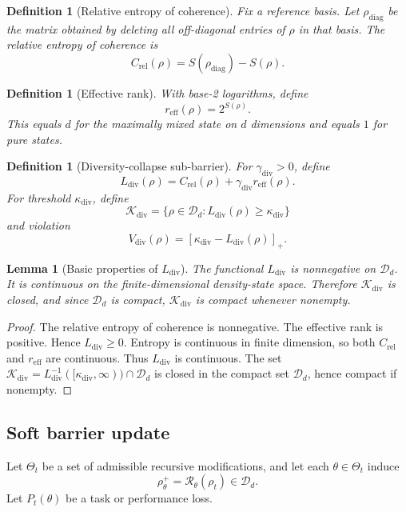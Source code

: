 \documentclass[11pt]{article}
\newtheorem{lemma}[theorem]{Lemma}
\newtheorem{definition}[theorem]{Definition}
\newcommand{\D}{\mathcal{D}}
\newcommand{\K}{\mathcal{K}}
\newcommand{\Rcal}{\mathcal{R}}
\newcommand{\1}{\mathbf{1}}
\newcommand{\diver}{\mathrm{div}}
\newcommand{\rel}{\mathrm{rel}}
\begin{document}
\begin{definition}[Relative entropy of coherence]
Fix a reference basis. Let \(\rho_{\mathrm{diag}}\) be the matrix obtained by deleting all off-diagonal entries of \(\rho\) in that basis. The relative entropy of coherence is
\[
C_{\rel}(\rho)=S(\rho_{\mathrm{diag}})-S(\rho).
\]
\end{definition}

\begin{definition}[Effective rank]
With base-2 logarithms, define
\[
r_{\mathrm{eff}}(\rho)=2^{S(\rho)}.
\]
This equals \(d\) for the maximally mixed state on \(d\) dimensions and equals \(1\) for pure states.
\end{definition}

\begin{definition}[Diversity-collapse sub-barrier]
For \(\gamma_{\diver}>0\), define
\[
L_{\diver}(\rho)
=
C_{\rel}(\rho)+\gamma_{\diver}r_{\mathrm{eff}}(\rho).
\]
For threshold \(\kappa_{\diver}\), define
\[
\K_{\diver}
=
\{\rho\in\D_d:L_{\diver}(\rho)\ge\kappa_{\diver}\}
\]
and violation
\[
V_{\diver}(\rho)
=
[\kappa_{\diver}-L_{\diver}(\rho)]_+.
\]
\end{definition}

\begin{lemma}[Basic properties of \(L_{\diver}\)]
The functional \(L_{\diver}\) is nonnegative on \(\D_d\). It is continuous on the finite-dimensional density-state space. Therefore \(\K_{\diver}\) is closed, and since \(\D_d\) is compact, \(\K_{\diver}\) is compact whenever nonempty.
\end{lemma}

\begin{proof}
The relative entropy of coherence is nonnegative. The effective rank is positive. Hence \(L_{\diver}\ge0\). Entropy is continuous in finite dimension, so both \(C_{\rel}\) and \(r_{\mathrm{eff}}\) are continuous. Thus \(L_{\diver}\) is continuous. The set \(\K_{\diver}=L_{\diver}^{-1}([\kappa_{\diver},\infty))\cap\D_d\) is closed in the compact set \(\D_d\), hence compact if nonempty.
\end{proof}

\subsection{Soft barrier update}

Let \(\Theta_t\) be a set of admissible recursive modifications, and let each \(\theta\in\Theta_t\) induce
\[
\rho^+_\theta=\Rcal_\theta(\rho_t)\in\D_d.
\]
Let \(P_t(\theta)\) be a task or performance loss.
\end{document}
